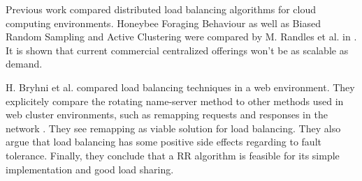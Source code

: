 Previous work compared distributed load balancing algorithms for cloud computing
environments.
Honeybee Foraging Behaviour as well as Biased Random Sampling and Active
Clustering were compared by M. Randles et al. in \cite{aCompDLBA}.
It is shown that current commercial centralized offerings won't be as scalable
as demand.

H. Bryhni et al. compared load balancing techniques in a web environment.
They explicitely compare the rotating name-server method to other methods used
in web cluster environments, such as remapping requests and responses in the
network \cite{aCompLBAforWeb}.
They see remapping as viable solution for load balancing.
They also argue that load balancing has some positive side effects regarding to
fault tolerance.
Finally, they conclude that a \ac{RR} algorithm is feasible for its simple
implementation and good load sharing.

